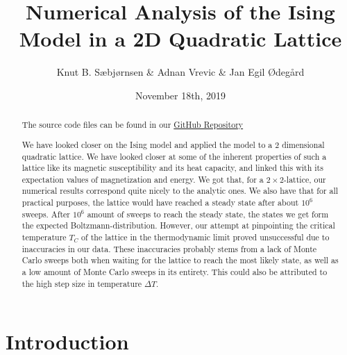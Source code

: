 \documentclass[reprint,english,notitlepage]{revtex4-1}  %
\begin{document}
\title{Numerical Analysis of the Ising Model in a 2D Quadratic Lattice}   %
\author{Knut B. Sæbjørnsen \& Adnan Vrevic \& Jan Egil Ødegård  } %
\date{November 18th, 2019}                             %
\noaffiliation                            %
\begin{abstract} %
\begin{center}
The source code files can be found in our \href{https://github.com/Jan-Egil/FYS3150}{GitHub Repository}
\end{center}
We have looked closer on the Ising model and applied the model to a 2 dimensional quadratic lattice. We have looked closer at some of the inherent properties of such a lattice like its magnetic susceptibility and its heat capacity, and linked this with its expectation values of magnetization and energy. We got that, for a $2\times2$-lattice, our numerical results correspond quite nicely to the analytic ones. We also have that for all practical purposes, the lattice would have reached a steady state after about $10^6$ sweeps. After $10^6$ amount of sweeps to reach the steady state, the states we get form the expected Boltzmann-distribution. However, our attempt at pinpointing the critical temperature $T_C$ of the lattice in the thermodynamic limit proved unsuccessful due to inaccuracies in our data. These inaccuracies probably stems from a lack of Monte Carlo sweeps both when waiting for the lattice to reach the most likely state, as well as a low amount of Monte Carlo sweeps in its entirety. This could also be attributed to the high step size in temperature $\Delta T$.

\end{abstract}                            %
\maketitle                                %


\section{Introduction}
\end{document}
